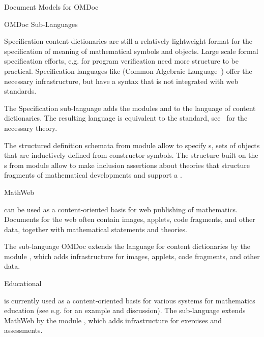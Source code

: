 \begin{module}[id=document-model]
\begin{omgroup}[id=document-model]{Document Models for OMDoc}
\begin{omgroup}[id=sub-languages]{OMDoc Sub-Languages}
\begin{module}[id=sub-languages]
\begin{omgroup}[id=sub-languages.spec]{Specification \omdoc}
\omdoc content dictionaries are still a relatively lightweight format for the
specification of meaning of mathematical symbols and objects. Large scale formal
specification efforts, e.g. for program verification need more structure to be
practical. Specification languages like {\casl} (Common Algebraic
 Language~\cite{CoFI:2004:CASL-RM}) offer the necessary
infrastructure, but have a syntax that is not integrated with web standards.

The Specification \omdoc sub-language adds the modules {} and
{} to the language of \omdoc content dictionaries. The resulting
language is equivalent to the {\casl} standard,
see~\cite{AutHut:tefsduc00,Hutter:mocsv00,MAH-06-a} for the necessary theory.

The structured definition schemata from module {} allow to specify
{s}, sets of objects that are inductively defined from
constructor symbols. The {} structure built on the
{s} from module {} allow to make inclusion
assertions about theories that structure fragments of mathematical developments and
support a .
\end{omgroup}

\begin{omgroup}[id=sub-languages.mathwebomdoc]{MathWeb \omdoc}

\omdoc can be used as a content-oriented basis for web publishing of
mathematics. Documents for the web often contain images, applets, code fragments,
and other data, together with mathematical statements and theories.

The \omdoc sub-language { {OMDoc}} extends the
language for \omdoc content dictionaries by the module {}, which adds
infrastructure for images, applets, code fragments, and other data.
\end{omgroup}

\begin{omgroup}[id=sub-languages.edu]{Educational \omdoc}

\omdoc is currently used as a content-oriented basis for various systems for mathematics
education (see e.g. {} for an example and discussion).  The \omdoc
sub-language  extends MathWeb \omdoc
by the module {}, which adds infrastructure for exercises and
assessments.
\end{omgroup}
\end{module}


\end{omgroup}
\end{omgroup}
\end{module}
